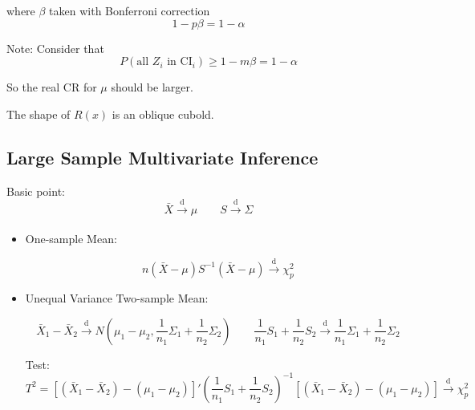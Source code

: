 \begin{itemize}
    where $ \beta  $ taken with Bonferroni correction
    \begin{equation}
        1-p\beta =1-\alpha  
    \end{equation}
    
    Note: Consider that
    \begin{equation}
        P(\text{all }Z_i\text{ in CI}_i)\geq 1-m\beta =1-\alpha  
    \end{equation}

    So the real CR for $ \mu $ should be larger.
    

    The shape of $ R(x) $ is an oblique cubold.
    
\end{itemize}
        





\subsection{Large Sample Multivariate Inference}
    Basic point:
    \begin{equation}
        \bar{X}\xrightarrow[]{\mathrm{d}} \mu\qquad S\xrightarrow[]{\mathrm{d}} \Sigma  
    \end{equation}
\begin{itemize}[topsep=2pt,itemsep=2pt]
    \item One-sample Mean:
    
    \begin{equation}
        n(\bar{X}-\mu)S^{-1}(\bar{X}-\mu)\xrightarrow[]{\mathrm{d}} \chi^2_p 
    \end{equation}

    \item Unequal Variance Two-sample Mean:
    
    \begin{equation}
        \bar{X}_1-\bar{X}_2\xrightarrow[]{\mathrm{d}} N\left(\mu_1-\mu _2,\dfrac{1}{n_1}\Sigma _1+\dfrac{1}{n_2}\Sigma _2\right) \qquad \dfrac{1}{n_1}S_1+\dfrac{1}{n_2}S_2\xrightarrow[]{\mathrm{d}} \dfrac{1}{n_1}\Sigma _1+\dfrac{1}{n_2}\Sigma _2
    \end{equation}

    Test:
    \begin{equation}
        T^2=\left[(\bar{X}_1-\bar{X}_2)-(\mu _1-\mu _2) \right]'(\dfrac{1}{n_1}S_1+\dfrac{1}{n_2}S_2)^{-1}\left[(\bar{X}_1-\bar{X}_2)-(\mu _1-\mu _2) \right]\xrightarrow[]{\mathrm{d}} \chi^2_p
    \end{equation}
    
    
    
    
\end{itemize}

